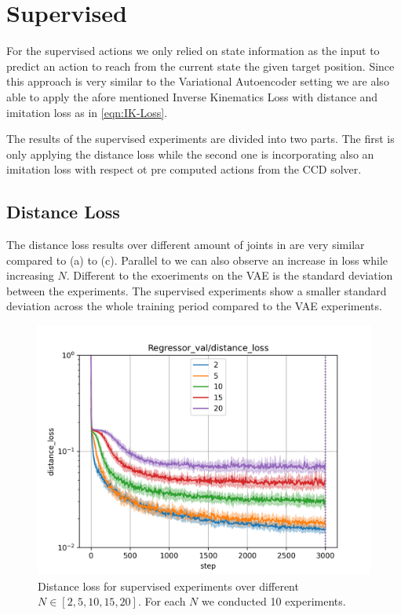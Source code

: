 \section{Supervised}

For the supervised actions we only relied on state information as the input to predict an action to reach from the current state the given target position.  Since this approach is very similar to the Variational Autoencoder setting we are also able to apply the afore mentioned Inverse Kinematics Loss with distance and imitation loss as in \eqref{eqn:IK-Loss}.

The results of the supervised experiments are divided into two parts. The first is only applying the distance loss while the second one is incorporating also an imitation loss with respect ot pre computed actions from the CCD solver.

\subsection{Distance Loss}

The distance loss results over different amount of joints in  are very similar compared to  (a) to (c). Parallel to  we can also observe an increase in loss while increasing $N$. Different to the exoeriments on the VAE is the standard deviation between the experiments. The supervised experiments show a smaller standard deviation across the whole training period compared to the VAE experiments.

\begin{figure}
    \begin{center}
        \includegraphics[width=0.46 \linewidth]{figures/experiments/supervised_2_distance_loss.png}
    \end{center}
    \caption[Supervised Distance Loss]{Distance loss for supervised experiments over different $N \in [2, 5, 10, 15, 20]$. For each $N$ we conducted 10 experiments. }
    \label{fig:supervised_distance}
\end{figure}


